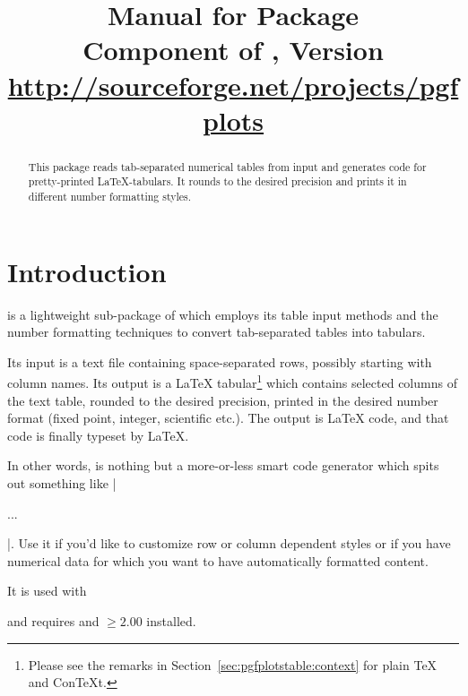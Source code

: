 \documentclass[a4paper]{ltxdoc}
\title{%
    Manual for Package \PGFPlotstable{}\\
    {\small Component of \PGFPlots{}, Version \pgfplotsversion}\\
    {\small\href{http://sourceforge.net/projects/pgfplots}{http://sourceforge.net/projects/pgfplots}}}
\begin{document}
\maketitle
\begin{abstract}
    This package reads tab-separated numerical tables from input and generates
    code for pretty-printed \LaTeX{}-tabulars. It rounds to the desired precision
    and prints it in different number formatting styles.
\end{abstract}

\tableofcontents


\section{Introduction}

\PGFPlotstable{} is a lightweight sub-package of \PGFPlots{} which employs its
table input methods and the number formatting techniques to convert
tab-separated tables into tabulars.

Its input is a text file containing space-separated rows, possibly starting
with column names. Its output is a \LaTeX{} tabular\footnote{Please see the
remarks in Section~\ref{sec:pgfplotstable:context} for plain \TeX{} and
Con\TeX{}t.} which contains selected columns of the text table, rounded to the
desired precision, printed in the desired number format (fixed point, integer,
scientific etc.). The output is \LaTeX{} code, and that code is finally typeset
by \LaTeX{}.

In other words, \PGFPlotstable{} is nothing but a more-or-less smart code
generator which spits out something like |\begin{tabular}...\end{tabular}|.
Use it if you'd like to customize row or column dependent styles or if you
have numerical data for which you want to have automatically formatted content.

It is used with
%
\begin{codeexample}
\usepackage{pgfplotstable}
\end{codeexample}
%
\noindent and requires \PGFPlots{} and \PGF{} $ \ge 2.00$ installed.
\end{document}
